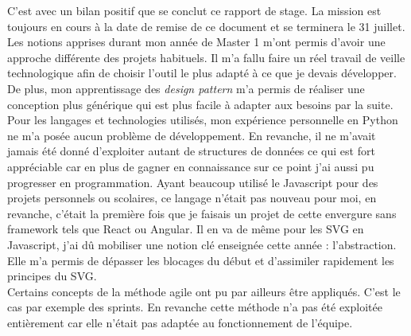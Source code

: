 C'est avec un bilan positif que se conclut ce rapport de stage. La mission est toujours en cours à la date de remise de ce document et se terminera le 31 juillet.\\

Les notions apprises durant mon année de Master 1 m'ont permis d'avoir une approche différente des projets habituels. Il m'a fallu faire un réel travail de veille technologique afin de choisir l'outil le plus adapté à ce que je devais développer. De plus, mon apprentissage des \textit{design pattern} m'a permis de réaliser une conception plus générique qui est plus facile à adapter aux besoins par la suite.\\

Pour les langages et technologies utilisés, mon expérience personnelle en Python ne m'a posée aucun problème de développement. En revanche, il ne m'avait jamais été donné d'exploiter autant de structures de données ce qui est fort appréciable car en plus de gagner en connaissance sur ce point j'ai aussi pu progresser en programmation. Ayant beaucoup utilisé le Javascript pour des projets personnels ou scolaires, ce langage n'était pas nouveau pour moi, en revanche, c'était la première fois que je faisais un projet de cette envergure sans framework tels que React ou Angular. Il en va de même pour les SVG en Javascript, j'ai dû mobiliser une notion clé enseignée cette année : l'abstraction. Elle m'a permis de dépasser les blocages du début et d'assimiler rapidement les principes du SVG.\\

Certains concepts de la méthode agile ont pu par ailleurs être appliqués. C'est le cas par exemple des sprints. En revanche cette méthode n'a pas été exploitée entièrement car elle n'était pas adaptée au fonctionnement de l'équipe.\\